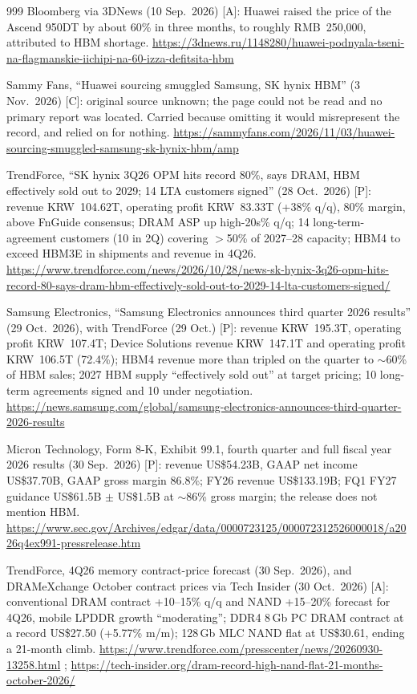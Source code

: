 \begin{thebibliography}{999}
 Bloomberg via 3DNews (10 Sep.\ 2026) [A]: Huawei raised the price of the Ascend 950DT by about 60\% in three months, to roughly RMB~250{,}000, attributed to HBM shortage. \url{https://3dnews.ru/1148280/huawei-podnyala-tseni-na-flagmanskie-iichipi-na-60-izza-defitsita-hbm}

 Sammy Fans, ``Huawei sourcing smuggled Samsung, SK hynix HBM'' (3 Nov.\ 2026) [C]: original source unknown; the page could not be read and no primary report was located. Carried because omitting it would misrepresent the record, and relied on for nothing. \url{https://sammyfans.com/2026/11/03/huawei-sourcing-smuggled-samsung-sk-hynix-hbm/amp}

 TrendForce, ``SK hynix 3Q26 OPM hits record 80\%, says DRAM, HBM effectively sold out to 2029; 14 LTA customers signed'' (28 Oct.\ 2026) [P]: revenue KRW~104.62T, operating profit KRW~83.33T (+38\% q/q), 80\% margin, above FnGuide consensus; DRAM ASP up high-20s\% q/q; 14 long-term-agreement customers (10 in 2Q) covering $>$50\% of 2027--28 capacity; HBM4 to exceed HBM3E in shipments and revenue in 4Q26. \url{https://www.trendforce.com/news/2026/10/28/news-sk-hynix-3q26-opm-hits-record-80-says-dram-hbm-effectively-sold-out-to-2029-14-lta-customers-signed/}

 Samsung Electronics, ``Samsung Electronics announces third quarter 2026 results'' (29 Oct.\ 2026), with TrendForce (29 Oct.) [P]: revenue KRW~195.3T, operating profit KRW~107.4T; Device Solutions revenue KRW~147.1T and operating profit KRW~106.5T (72.4\%); HBM4 revenue more than tripled on the quarter to $\sim$60\% of HBM sales; 2027 HBM supply ``effectively sold out'' at target pricing; 10 long-term agreements signed and 10 under negotiation. \url{https://news.samsung.com/global/samsung-electronics-announces-third-quarter-2026-results}

 Micron Technology, Form 8-K, Exhibit 99.1, fourth quarter and full fiscal year 2026 results (30 Sep.\ 2026) [P]: revenue US\$54.23B, GAAP net income US\$37.70B, GAAP gross margin 86.8\%; FY26 revenue US\$133.19B; FQ1 FY27 guidance US\$61.5B $\pm$ US\$1.5B at $\sim$86\% gross margin; the release does not mention HBM. \url{https://www.sec.gov/Archives/edgar/data/0000723125/000072312526000018/a2026q4ex991-pressrelease.htm}

 TrendForce, 4Q26 memory contract-price forecast (30 Sep.\ 2026), and DRAMeXchange October contract prices via Tech Insider (30 Oct.\ 2026) [A]: conventional DRAM contract +10--15\% q/q and NAND +15--20\% forecast for 4Q26, mobile LPDDR growth ``moderating''; DDR4 8\,Gb PC DRAM contract at a record US\$27.50 (+5.77\% m/m); 128\,Gb MLC NAND flat at US\$30.61, ending a 21-month climb. \url{https://www.trendforce.com/presscenter/news/20260930-13258.html} ; \url{https://tech-insider.org/dram-record-high-nand-flat-21-months-october-2026/}


\end{thebibliography}
